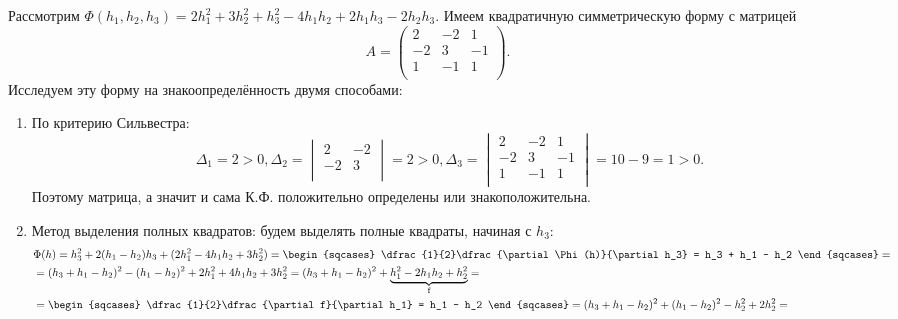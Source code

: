 \begin{example}
	Рассмотрим $\Phi(h_1, h_2, h_3) = 2h_1^2 + 3h_2^2 + h_3^2 - 4h_1h_2 + 2h_1h_3 - 2h_2h_3$. Имеем
	квадратичную симметрическую форму с матрицей
	\begin{equation*}
		A =
		\begin{pmatrix}
			2 & -2 & 1\\
			-2 & 3 & -1\\
			1 & -1 & 1\\
		\end{pmatrix}.
	\end{equation*}
	Исследуем эту форму на знакоопределённость двумя способами:
	\begin{enumerate}
	  \item По критерию Сильвестра:
		\begin{equation*}
			\Delta_1 = 2 > 0, \Delta_2 =
			\begin{vmatrix}
				2 & -2\\
				-2 & 3\\
			\end{vmatrix} = 2 > 0,
			\Delta_3 =
			\begin{vmatrix}
				2 & -2 & 1\\
				-2 & 3 & -1\\
				1 & -1 & 1\\
			\end{vmatrix} = 10 - 9 = 1 > 0.
		\end{equation*}
		Поэтому матрица, а значит и сама К.Ф. положительно определены или знакоположительна.
	  \item Метод выделения полных квадратов: будем выделять полные квадраты, начиная с $h_3$:
		\begin{equation*}
			\begin{split}
				&\Phi(h) = h_3^2 + 2(h_1 - h_2)h_3 + (2h_1^2 - 4h_1h_2 + 3h_2^2) =
				\begin{sqcases}
					\dfrac{1}{2}\dfrac{\partial \Phi(h)}{\partial h_3} = h_3 + h_1 - h_2
				\end{sqcases} =\\
				&=(h_3 + h_1 - h_2)^2 - (h_1 - h_2)^2 + 2h_1^2 + 4h_1h_2 + 3h_2^2 =
				(h_3 + h_1 - h_2)^2 + \underbrace{h_1^2 - 2h_1h_2 + h_2^2}_{\text{f}} =\\
				&=\begin{sqcases}
					\dfrac{1}{2}\dfrac{\partial f}{\partial h_1} = h_1 - h_2
				\end{sqcases}=
				(h_3 + h_1 - h_2)^2 + (h_1 - h_2)^2 - h_2^2 + 2h_2^2 =\\

\end{split}
\end{equation*}
\end{enumerate}
\end{example}
